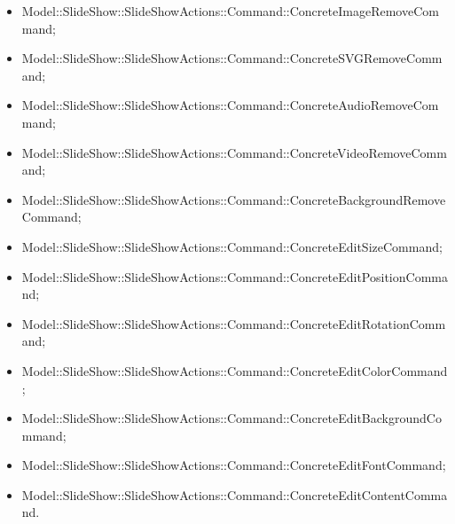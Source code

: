 {{\begin{itemize}
                    \item Model::SlideShow::SlideShowActions::Command::ConcreteImageRemoveCommand;
                    \item Model::SlideShow::SlideShowActions::Command::ConcreteSVGRemoveCommand;
                    \item Model::SlideShow::SlideShowActions::Command::ConcreteAudioRemoveCommand;
                    \item Model::SlideShow::SlideShowActions::Command::ConcreteVideoRemoveCommand;
                    \item Model::SlideShow::SlideShowActions::Command::ConcreteBackgroundRemoveCommand;
                    \item Model::SlideShow::SlideShowActions::Command::ConcreteEditSizeCommand;
                    \item Model::SlideShow::SlideShowActions::Command::ConcreteEditPositionCommand;
                    \item Model::SlideShow::SlideShowActions::Command::ConcreteEditRotationCommand;
                    \item Model::SlideShow::SlideShowActions::Command::ConcreteEditColorCommand;
                    \item Model::SlideShow::SlideShowActions::Command::ConcreteEditBackgroundCommand;
                    \item Model::SlideShow::SlideShowActions::Command::ConcreteEditFontCommand;
                    \item Model::SlideShow::SlideShowActions::Command::ConcreteEditContentCommand.
                    \end{itemize}
                    }
    }
